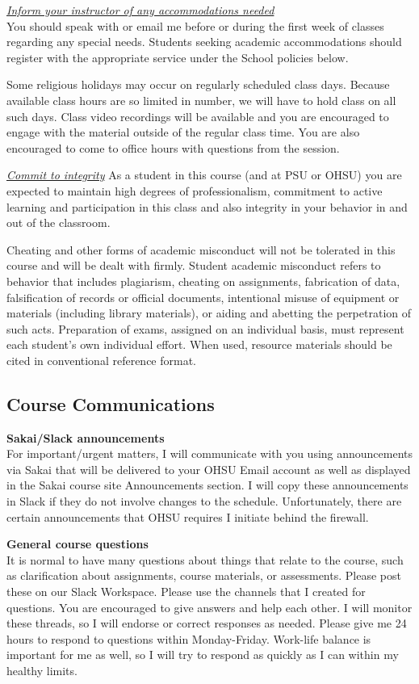 \documentclass[
  letterpaper,
  DIV=11,
  numbers=noendperiod]{scrartcl}
\begin{document}
\ul{\emph{Inform your instructor of any accommodations needed}}\\
You should speak with or email me before or during the first week of
classes regarding any special needs. Students seeking academic
accommodations should register with the appropriate service under the
School policies below.

Some religious holidays may occur on regularly scheduled class days.
Because available class hours are so limited in number, we will have to
hold class on all such days. Class video recordings will be available
and you are encouraged to engage with the material outside of the
regular class time. You are also encouraged to come to office hours with
questions from the session.

\ul{\emph{Commit to integrity}}\textbf{\hfill\break
}As a student in this course (and at PSU or OHSU) you are expected to
maintain high degrees of professionalism, commitment to active learning
and participation in this class and also integrity in your behavior in
and out of the classroom.

Cheating and other forms of academic misconduct will not be tolerated in
this course and will be dealt with firmly. Student academic misconduct
refers to behavior that includes plagiarism, cheating on assignments,
fabrication of data, falsification of records or official documents,
intentional misuse of equipment or materials (including library
materials), or aiding and abetting the perpetration of such acts.
Preparation of exams, assigned on an individual basis, must represent
each student's own individual effort. When used, resource materials
should be cited in conventional reference format.

\subsection{Course Communications}\label{course-communications}

\textbf{Sakai/Slack announcements\\
}For important/urgent matters, I will communicate with you using
announcements via Sakai that will be delivered to your OHSU Email
account as well as displayed in the Sakai course site Announcements
section. I will copy these announcements in Slack if they do not involve
changes to the schedule. Unfortunately, there are certain announcements
that OHSU requires I initiate behind the firewall.

\textbf{General course questions\\
}It is normal to have many questions about things that relate to the
course, such as clarification about assignments, course materials, or
assessments. Please post these on our Slack Workspace. Please use the
channels that I created for questions. You are encouraged to give
answers and help each other. I will monitor these threads, so I will
endorse or correct responses as needed. Please give me 24 hours to
respond to questions within Monday-Friday. Work-life balance is
important for me as well, so I will try to respond as quickly as I can
within my healthy limits.~
\end{document}
